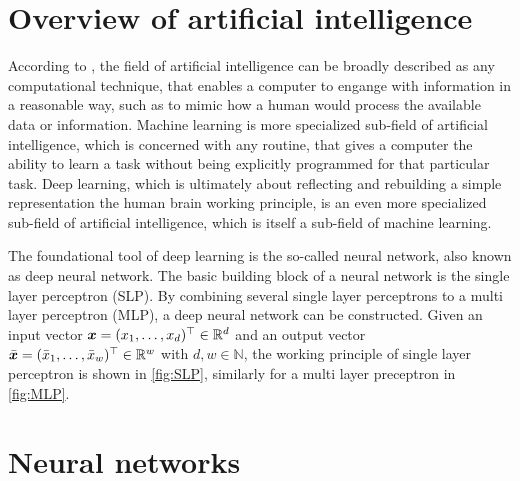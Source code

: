 \documentclass[a4paper,12pt]{report}
\begin{document}
\section{Overview of artificial intelligence}
According to \cite[p.7]{Amini.2023}, the field of artificial intelligence can be broadly described as any computational technique, that enables a computer to engange with information in a reasonable way, such as to mimic how a human would process the available data or information. Machine learning is more specialized sub-field of artificial intelligence, which is concerned with any routine, that gives a computer the ability to learn a task without being explicitly programmed for that particular task. Deep learning, which is ultimately about reflecting and rebuilding a simple representation the human brain working principle, is an even more specialized sub-field of artificial intelligence, which is itself a sub-field of machine learning.

The foundational tool of deep learning is the so-called neural network, also known as deep neural network. The basic building block of a neural network is the single layer perceptron (SLP). By combining several single layer perceptrons to a multi layer perceptron (MLP), a deep neural network can be constructed. Given an input vector $\bm{x} = (x_1, \dots, x_d)^\top \in\mathbb{R}^d$ and an output vector $\bar{\bm{x}} = (\bar{x}_1,\dots,\bar{x}_w)^\top \in \mathbb{R}^w$ with $d,w \in \mathbb{N}$, the working principle of single layer perceptron is shown in \cref{fig:SLP}, similarly for a multi layer preceptron in \cref{fig:MLP}.

\section{Neural networks}
\end{document}
